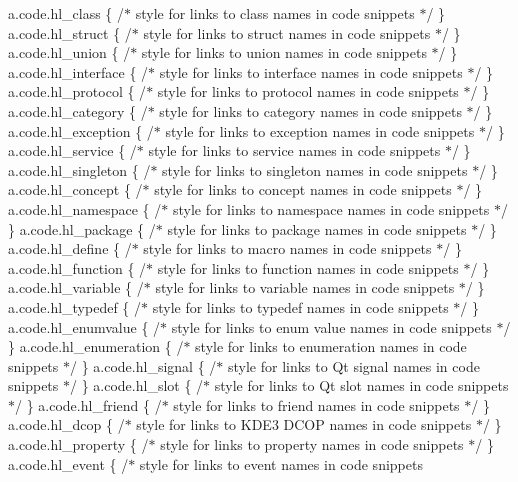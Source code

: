 a.\+code.\+hl\+\_\+class \{ /\texorpdfstring{$\ast$}{*} style for links to class names in code snippets \texorpdfstring{$\ast$}{*}/ \} a.\+code.\+hl\+\_\+struct \{ /\texorpdfstring{$\ast$}{*} style for links to struct names in code snippets \texorpdfstring{$\ast$}{*}/ \} a.\+code.\+hl\+\_\+union \{ /\texorpdfstring{$\ast$}{*} style for links to union names in code snippets \texorpdfstring{$\ast$}{*}/ \} a.\+code.\+hl\+\_\+interface \{ /\texorpdfstring{$\ast$}{*} style for links to interface names in code snippets \texorpdfstring{$\ast$}{*}/ \} a.\+code.\+hl\+\_\+protocol \{ /\texorpdfstring{$\ast$}{*} style for links to protocol names in code snippets \texorpdfstring{$\ast$}{*}/ \} a.\+code.\+hl\+\_\+category \{ /\texorpdfstring{$\ast$}{*} style for links to category names in code snippets \texorpdfstring{$\ast$}{*}/ \} a.\+code.\+hl\+\_\+exception \{ /\texorpdfstring{$\ast$}{*} style for links to exception names in code snippets \texorpdfstring{$\ast$}{*}/ \} a.\+code.\+hl\+\_\+service \{ /\texorpdfstring{$\ast$}{*} style for links to service names in code snippets \texorpdfstring{$\ast$}{*}/ \} a.\+code.\+hl\+\_\+singleton \{ /\texorpdfstring{$\ast$}{*} style for links to singleton names in code snippets \texorpdfstring{$\ast$}{*}/ \} a.\+code.\+hl\+\_\+concept \{ /\texorpdfstring{$\ast$}{*} style for links to concept names in code snippets \texorpdfstring{$\ast$}{*}/ \} a.\+code.\+hl\+\_\+namespace \{ /\texorpdfstring{$\ast$}{*} style for links to namespace names in code snippets \texorpdfstring{$\ast$}{*}/ \} a.\+code.\+hl\+\_\+package \{ /\texorpdfstring{$\ast$}{*} style for links to package names in code snippets \texorpdfstring{$\ast$}{*}/ \} a.\+code.\+hl\+\_\+define \{ /\texorpdfstring{$\ast$}{*} style for links to macro names in code snippets \texorpdfstring{$\ast$}{*}/ \} a.\+code.\+hl\+\_\+function \{ /\texorpdfstring{$\ast$}{*} style for links to function names in code snippets \texorpdfstring{$\ast$}{*}/ \} a.\+code.\+hl\+\_\+variable \{ /\texorpdfstring{$\ast$}{*} style for links to variable names in code snippets \texorpdfstring{$\ast$}{*}/ \} a.\+code.\+hl\+\_\+typedef \{ /\texorpdfstring{$\ast$}{*} style for links to typedef names in code snippets \texorpdfstring{$\ast$}{*}/ \} a.\+code.\+hl\+\_\+enumvalue \{ /\texorpdfstring{$\ast$}{*} style for links to enum value names in code snippets \texorpdfstring{$\ast$}{*}/ \} a.\+code.\+hl\+\_\+enumeration \{ /\texorpdfstring{$\ast$}{*} style for links to enumeration names in code snippets \texorpdfstring{$\ast$}{*}/ \} a.\+code.\+hl\+\_\+signal \{ /\texorpdfstring{$\ast$}{*} style for links to Qt signal names in code snippets \texorpdfstring{$\ast$}{*}/ \} a.\+code.\+hl\+\_\+slot \{ /\texorpdfstring{$\ast$}{*} style for links to Qt slot names in code snippets \texorpdfstring{$\ast$}{*}/ \} a.\+code.\+hl\+\_\+friend \{ /\texorpdfstring{$\ast$}{*} style for links to friend names in code snippets \texorpdfstring{$\ast$}{*}/ \} a.\+code.\+hl\+\_\+dcop \{ /\texorpdfstring{$\ast$}{*} style for links to KDE3 DCOP names in code snippets \texorpdfstring{$\ast$}{*}/ \} a.\+code.\+hl\+\_\+property \{ /\texorpdfstring{$\ast$}{*} style for links to property names in code snippets \texorpdfstring{$\ast$}{*}/ \} a.\+code.\+hl\+\_\+event \{ /\texorpdfstring{$\ast$}{*} style for links to event names in code snippets 